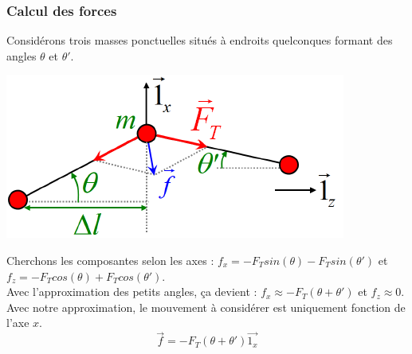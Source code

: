 \documentclass	[11pt, a4paper, openany]{book}
\begin{document}
\subsubsection{Calcul des forces}
Considérons trois masses ponctuelles situés à endroits quelconques formant des angles $\theta$ et $\theta '$.
\begin{center}
\includegraphics[scale=0.5]{oo/image23.png}
\end{center}
Cherchons les composantes selon les axes : $f_x = -F_Tsin(\theta) - F_Tsin(\theta ')$ et $f_z = -F_Tcos(\theta) + F_Tcos(\theta ')$.\\
Avec l'approximation des petits angles, ça devient : $f_x \approx -F_T(\theta + \theta ')$ et $f_z \approx 0$. Avec notre approximation, le mouvement à considérer est uniquement fonction de l'axe $x$.
\begin{equation}
\vec{f} = -F_T(\theta + \theta ')\vec{1_x}
\end{equation}
\end{document}
